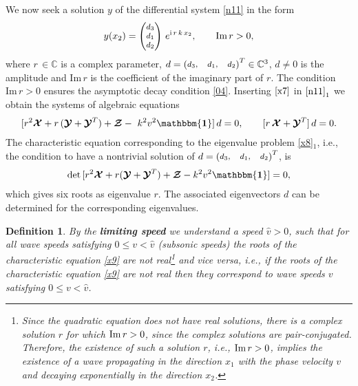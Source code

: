\documentclass[10pt]{article}
\newcommand{\id}{{\mathbf{\mathbbm{1}}}}
\newtheorem{definition}[theorem]{Definition}
\begin{document}
We now  seek  a solution $y$ of the differential system \eqref{n11} in the form 
 \begin{align}\label{x7}
 y(x_2)=\begin{footnotesize}\begin{pmatrix} 	d_3
 	\\
 	d_1
 	\\d_2
 	\end{pmatrix}\end{footnotesize} \,e^{{\rm i}\,r\,k\,x_2},\qquad \text{Im}\,r>0,
 \end{align}
 where $r \, \in \mathbb{C}$ is a complex parameter, $d=\begin{footnotesize}\begin{pmatrix} 	d_3,
 &
 d_1,
 &d_2
 \end{pmatrix}\end{footnotesize}^T \in \mathbb{C}^3 $, $d
 \neq 0$ is the amplitude and $ \text{Im}\,r$ is the coefficient of the imaginary part of $r$. The  condition $\text{Im}\,r>0$ ensures the asymptotic decay condition \eqref{04}. 
 Inserting $\eqref{x7}$ in $\eqref{n11}_1$ we obtain the  systems of algebraic equations
 \begin{align}\label{x8}
 [r^2\boldsymbol{\mathcal{X}}+r\,(\boldsymbol{\mathcal{Y}}+\boldsymbol{\mathcal{Y}}^T)+\boldsymbol{\mathcal{Z}}-\ k^2 v^2 {\id}]\,d=0,\qquad 
 [r\,\boldsymbol{\mathcal{X}}+\boldsymbol{\mathcal{Y}}^T]\,d=0.
 \end{align}
 The characteristic equation corresponding to the eigenvalue problem \eqref{x8}$_1$, i.e., the condition to have a nontrivial solution of $d=\begin{footnotesize}\begin{pmatrix} 	d_3,
&
 d_1,
&d_2
 \end{pmatrix}\end{footnotesize}^T$, is 
 \begin{align}\label{x9}
 \det\,[r^2\boldsymbol{\mathcal{X}}+r(\boldsymbol{\mathcal{Y}}+\boldsymbol{\mathcal{Y}}^T)+\boldsymbol{\mathcal{Z}}-k^2 v^2 {\id}]=0,
 \end{align}
 which gives six roots as eigenvalue $r$. The associated eigenvectors $d$ can be determined for the corresponding eigenvalues. 
\begin{definition}
	By the {\bf limiting speed} we understand a speed $\widehat{v}>0$, such that for all wave speeds satisfying 	$0\le v<\widehat{v}$  (subsonic speeds) the roots  of the characteristic equation \eqref{x9} are not real\footnote{{Since the quadratic equation does not have real solutions, there is a complex solution $r$ for which ${\rm Im}\, r>0$, since the complex solutions are pair-conjugated. Therefore, the existence of such a solution $r$, i.e., ${\rm Im}\, r>0$, implies the existence of a  wave propagating in the direction $x_1$ with the
		phase velocity $v$ and decaying exponentially in the direction $x_2$.}} and vice versa, i.e., if the roots  of the characteristic equation \eqref{x9} are not real then they correspond to wave speeds $v$ satisfying 	$0\le v<\widehat{v}$.
\end{definition} 
\end{document}
